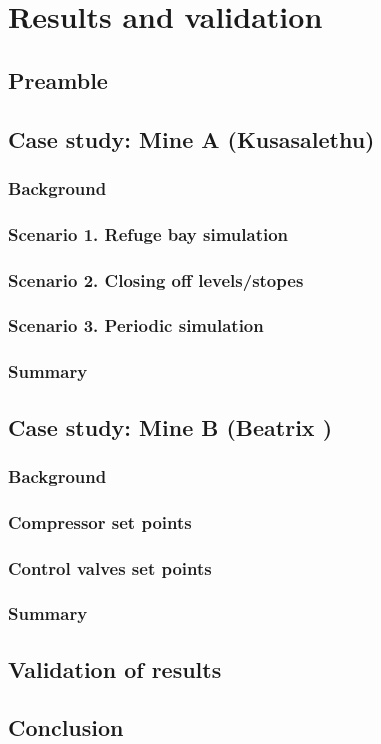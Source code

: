 \chapter{Results and validation}
\section{Preamble}
\section{Case study: Mine A \color{blue}(Kusasalethu)}
	\subsection{Background}
	\subsection{Scenario 1. Refuge bay simulation}
	\subsection{Scenario 2. Closing off levels/stopes}
	\subsection{Scenario 3. Periodic simulation}
	\subsection{Summary}
\section{Case study: Mine B \color{blue}(Beatrix )}
	\subsection{Background}
	\subsection{Compressor set points}
	\subsection{Control valves set points}
	\subsection{Summary}
\section{Validation of results}
\section{Conclusion}